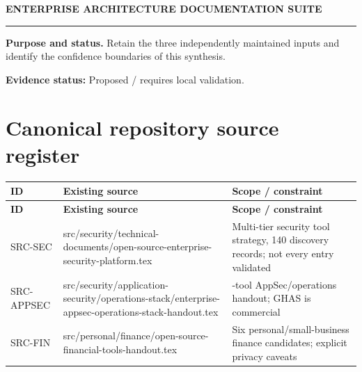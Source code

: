 \documentclass[10pt,letterpaper]{article}
\begin{document}
\begin{center}
{\large\bfseries\color{teal} ENTERPRISE ARCHITECTURE DOCUMENTATION SUITE}\par
{}\par
{}\par
\end{center}
\vspace{8pt}\hrule\vspace{12pt}
\textbf{Purpose and status.} Retain the three independently maintained inputs and identify the confidence boundaries of this synthesis.\par
\textbf{Evidence status:} Proposed / requires local validation.\par
\section{Canonical repository source register}
\small\begin{longtable}{>{\raggedright\arraybackslash}p{}>{\raggedright\arraybackslash}p{}>{\raggedright\arraybackslash}p{}}
\toprule
\textbf{ID} & \textbf{Existing source} & \textbf{Scope / constraint}\\
\midrule\endfirsthead
\toprule
\textbf{ID} & \textbf{Existing source} & \textbf{Scope / constraint}\\
\midrule\endhead
SRC-SEC & src/security/technical-documents/open-source-enterprise-security-platform.tex & Multi-tier security tool strategy, 140 discovery records; not every entry validated\\
SRC-APPSEC & src/security/application-security/operations-stack/enterprise-appsec-operations-stack-handout.tex & 11-tool AppSec/operations handout; GHAS is commercial\\
SRC-FIN & src/personal/finance/open-source-financial-tools-handout.tex & Six personal/small-business finance candidates; explicit privacy caveats\\
\bottomrule
\end{longtable}
\normalsize
\end{document}
